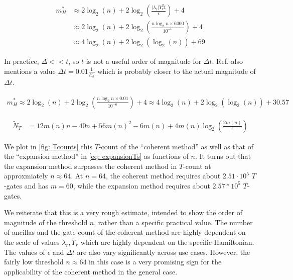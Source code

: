\begin{equation}
    \begin{split}
        m^*_{H} &\approx 2\log_2(n) + 2\log_2\left(\frac{|\lambda_r|Y_r^2 t}{\epsilon}\right) + 4 \\
        &\approx 2\log_2(n) + 2\log_2\left(\frac{n\log_2{n}\times 6000}{10^{-6}}\right) + 4 \\
        &\approx 4\log_2(n) + 2\log_2(\log_2(n)) + 69
    \end{split}
\end{equation}

In practice, $\Delta << t$, so $t$ is not a useful order of magnitude for $\Delta t$. Ref. \cite{Gate_Count} also mentions a value $\Delta t = 0.01 \frac{1}{E_h}$ which is probably closer to the actual magnitude of $\Delta t$.

\begin{equation}
    \begin{split}
        m^*_{H} \approx 2\log_2(n) + 2\log_2\left(\frac{n\log_2{n}\times 0.01}{10^{-6}}\right) + 4 \approx 4\log_2(n) + 2\log_2(\log_2(n)) + 30.57
    \end{split}
\end{equation}

\begin{equation}
    \begin{split}
        \tilde{N}_{T} &= 12m(n)n - 40n + 56m(n)^2 - 6m(n) + 4m(n)\log_2(\frac{2m(n)}{\epsilon})
    \end{split}
\end{equation}

We plot in \ref{fig: Tcounts} this $T$-count of the ``coherent method'' as well as that of the ``expansion method'' in \eqref{eq: expansionTs} as functions of $n$. It turns out that the expansion method surpasses the coherent method in $T$-count at approxmiately $n \approx 64$. At $n = 64$, the coherent method requires about $2.51 \cdot 10^5$ $T$-gates and has $m = 60$, while the expansion method requires about $2.57 * 10^5$ $T$-gates.

We reiterate that this is a very rough estimate, intended to show the order of magnitude of the threshold $n$, rather than a specific practical value. The number of ancillas and the gate count of the coherent method are highly dependent on the scale of values $\lambda_r, Y_r$ which are highly dependent on the specific Hamiltonian. The values of $\epsilon$ and $\Delta t$ are also vary significantly across use cases. However, the fairly low threshold $n \approx 64$ in this case is a very promising sign for the applicability of the coherent method in the general case.


